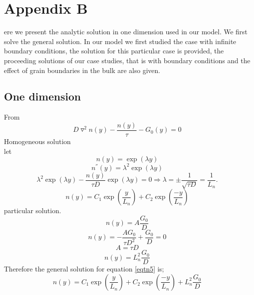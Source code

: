 
\chapter{Appendix B}
\label{app:app02}

ere we present the analytic solution in one dimension used in our model. We first solve the general solution. In our model we first studied the case with infinite boundary conditions, the solution for this particular case is provided, the proceeding solutions of our case studies, that is with boundary conditions and the effect of grain boundaries in the bulk are also given.

\section{One dimension}
From 
\begin{equation}\label{eqtn5}
   D\triangledown^2n(y) - \frac{n(y)}{\tau} -G_0(y) = 0
  \end{equation}
 Homogeneous solution \\
 let 
\begin{equation}\label{eqtn6}
  n(y)= \exp(\lambda y) 
   \end{equation}
  \begin{equation}\label{eqtn7}
  n^{''}(y) = \lambda^2 \exp(\lambda y)
 \end{equation}
 \begin{equation}\label{eqtn8}
\lambda^2 \exp(\lambda y) -\frac{n(y)}{\tau D}\exp(\lambda y)  = 0 \Rightarrow \lambda = \pm \frac{1}{\sqrt{\tau D}} = \frac{1}{L_n}. 
\end{equation}
\begin{equation}\label{eqtn11}
n(y) = C_1\exp\left(\frac{y}{L_n}\right) + C_2\exp \left(\frac{-y}{L_n}\right)
\end{equation}
particular solution.
\begin{equation*}
n(y) = A\frac{G_0}{D} 
\end{equation*}
\begin{equation*}
n(y) = -\frac{AG_0}{\tau D^2} + \frac{G_0}{D} = 0 
\end{equation*}
\begin{equation*}
A = \tau D
\end{equation*}
\begin{equation}
\label{eqtn:eq09}
n(y) = L_n^2\frac{G_0}{D} 
\end{equation}
Therefore the general solution for equation \ref{eqtn5} is;
\begin{equation}\label{eqtn10}
n(y) = C_1\exp \left(\frac{y}{L_n}\right) + C_2\exp\left(\frac{-y}{L_n}\right) +  L_n^2\frac{G_0}{D} 
\end{equation}

